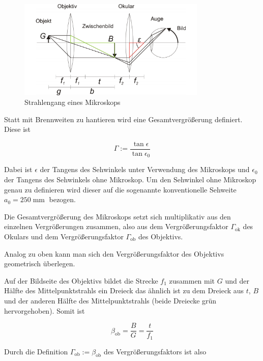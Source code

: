 \documentclass[a4paper,german,12pt,smallheadings]{scrartcl}
\begin{document}
\begin{figure}[h!]
    \centering
    \includegraphics[width=0.8\textwidth]{mikroskop.png}
    \caption{Strahlengang eines Mikroskops}
    \label{fig:mikroskop}
\end{figure}

Statt mit Brennweiten zu hantieren wird eine Gesamtvergrößerung definiert.
Diese ist

\begin{equation}
  \Gamma := \frac{\tan \epsilon}{\tan \epsilon_0}
\end{equation}

Dabei ist $\epsilon$ der Tangens des Sehwinkels unter Verwendung des Mikroskops
und $\epsilon_0$ der Tangens des Sehwinkels ohne Mikroskop. Um den Sehwinkel
ohne Mikroskop genau zu definieren wird dieser auf die sogenannte
konventionelle Sehweite $a_0 = 250 \operatorname{mm}$ bezogen.

Die Gesamtvergrößerung des Mikroskops setzt sich multiplikativ aus den
einzelnen Vergrößerungen zusammen, also aus dem Vergrößerungsfaktor
$\Gamma_\text{ok}$ des Okulars und dem Vergrößerungsfaktor $\Gamma_\text{ob}$
des Objektivs.

Analog zu oben kann man sich den Vergrößerungsfaktor des Objektivs geometrisch
überlegen.

Auf der Bildseite des Objektivs bildet die Strecke $f_1$ zusammen mit $G$ und
der Hälfte des Mittelpunktstrahls ein Dreieck das ähnlich ist zu dem Dreieck
aus $t$, $B$ und der anderen Hälfte des Mittelpunktstrahls (beide Dreiecke grün
hervorgehoben). Somit ist

\begin{equation}
  \beta_\text{ob} = \frac{B}{G} = \frac{t}{f_1}
\end{equation}

Durch die Definition $\Gamma_\text{ob} := \beta_\text{ob}$ des
Vergrößerungsfaktors ist also
\end{document}
